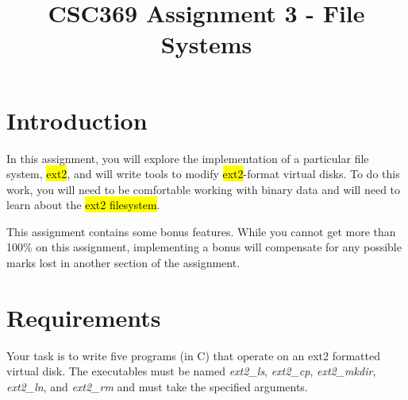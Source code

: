 \documentclass[12pt]{article}
\begin{document}
\title{CSC369 Assignment 3 - File Systems}
\maketitle

\bigskip

\section{Introduction}

\bigskip

\noindent In this assignment, you will explore the implementation of a particular file
system, \hl{ext2}, and will write tools to modify \hl{ext2}-format virtual disks. To do
this work, you will need to be comfortable working with binary data and will
need to learn about the \hl{ext2 filesystem}.

\bigskip

\noindent This assignment contains some bonus features. While you cannot get more than
100\% on this assignment, implementing a bonus will compensate for any possible
marks lost in another section of the assignment.

\bigskip

\section{Requirements}

\bigskip

Your task is to write five programs (in C) that operate on an ext2 formatted
virtual disk. The executables must be named \textit{ext2\_ls}, \textit{ext2\_cp},
\textit{ext2\_mkdir}, \textit{ext2\_ln}, and \textit{ext2\_rm} and must take the
specified arguments.

\bigskip
\end{document}
